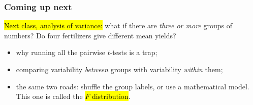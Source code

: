 \documentclass[slidestop,compress,mathserif]{beamer}
\begin{document}
\begin{frame}
\frametitle{Coming up next}

\hl{Next class, analysis of variance:} what if there are \emph{three or more} groups of numbers? Do four fertilizers give different mean yields?

\begin{itemize}
\item why running all the pairwise $t$-tests is a trap;
\item comparing variability \emph{between} groups with variability \emph{within} them;
\item the same two roads: shuffle the group labels, or use a mathematical model. This one is called the \hl{$F$ distribution}.
\end{itemize}

\end{frame}


\end{document}
